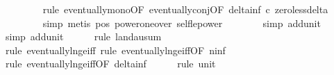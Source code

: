 \begin{isabellebody}
\ \ \ \ \ \ \ \isamarkupfalse%
\ {\isacharparenleft}{\kern0pt}rule\ eventually{\isacharunderscore}{\kern0pt}mono{\isacharbrackleft}{\kern0pt}OF\ eventually{\isacharunderscore}{\kern0pt}conj{\isacharbrackleft}{\kern0pt}OF\ delta{\isacharunderscore}{\kern0pt}inf{\isacharbrackleft}{\kern0pt}\ c{\isacharequal}{\kern0pt}{\isachardoublequoteopen}{}{\isachardoublequoteclose}{\isacharbrackright}{\kern0pt}\ zero{\isacharunderscore}{\kern0pt}less{\isacharunderscore}{\kern0pt}delta{\isacharbrackright}{\kern0pt}{\isacharbrackright}{\kern0pt}{\isacharparenright}{\kern0pt}\isanewline
\ \ \ \ \ \ \ \isamarkupfalse%
\ {\isacharparenleft}{\kern0pt}simp{\isacharcomma}{\kern0pt}\ metis\ pos{}\ power{\isacharunderscore}{\kern0pt}one{\isacharunderscore}{\kern0pt}over\ self{\isacharunderscore}{\kern0pt}le{\isacharunderscore}{\kern0pt}power{\isacharparenright}{\kern0pt}\isanewline
\ \ \ \ \ \ \isamarkupfalse%
\ {\isacharparenleft}{\kern0pt}simp\ add{\isacharcolon}{\kern0pt}unit{\isacharunderscore}{\kern0pt}{}{\isacharparenright}{\kern0pt}\isanewline
\ \ \ \ \ \isamarkupfalse%
\ {\isacharparenleft}{\kern0pt}simp\ add{\isacharcolon}{\kern0pt}unit{\isacharunderscore}{\kern0pt}{}{\isacharparenright}{\kern0pt}\isanewline
\ \ \ \ \isamarkupfalse%
\ {\isacharparenleft}{\kern0pt}rule\ landau{\isacharunderscore}{\kern0pt}sum{\isacharunderscore}{\kern0pt}{}{\isacharparenright}{\kern0pt}\isanewline
\ \ \ \ \ \ \isamarkupfalse%
\ {\isacharparenleft}{\kern0pt}rule\ eventually{\isacharunderscore}{\kern0pt}ln{\isacharunderscore}{\kern0pt}ge{\isacharunderscore}{\kern0pt}iff{\isacharcomma}{\kern0pt}\ rule\ eventually{\isacharunderscore}{\kern0pt}ln{\isacharunderscore}{\kern0pt}ge{\isacharunderscore}{\kern0pt}iff{\isacharbrackleft}{\kern0pt}OF\ n{\isacharunderscore}{\kern0pt}inf{\isacharbrackright}{\kern0pt}{\isacharparenright}{\kern0pt}\isanewline
\ \ \ \ \ \isamarkupfalse%
\ {\isacharparenleft}{\kern0pt}rule\ eventually{\isacharunderscore}{\kern0pt}ln{\isacharunderscore}{\kern0pt}ge{\isacharunderscore}{\kern0pt}iff{\isacharbrackleft}{\kern0pt}OF\ delta{\isacharunderscore}{\kern0pt}inf{\isacharbrackright}{\kern0pt}{\isacharparenright}{\kern0pt}\isanewline
\ \ \ \ \isamarkupfalse%
\ {\isacharparenleft}{\kern0pt}rule\ unit{\isacharunderscore}{\kern0pt}{}{\isacharparenright}{\kern0pt}\isanewline
\isanewline
\ \ \isamarkupfalse%

\end{isabellebody}
